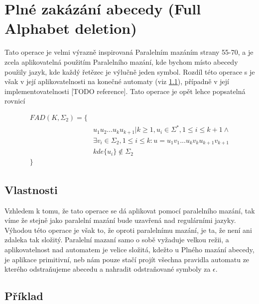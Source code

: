 \section{Plné zakázání abecedy (Full Alphabet deletion)}
Tato operace je velmi výrazně inspirovaná Paralelním mazáním \cite{lilaKari} strany 55-70, a je zcela aplikovatelná použitím Paralelního mazání, kde bychom místo abecedy použily jazyk, kde každý řetězec je výlučně jeden symbol. Rozdíl této operace s je však v její aplikovatelnosti na konečné automaty (viz \ref{subsec:fadProp}), případně v její implementovatelnosti [TODO reference]. Tato operace je opět lehce popsatelná rovnicí

\begin{equation}
	\begin{split}
		FAD(K,\Sigma_{2}) = \{&\\
		&u_{1}u_{2}...u_{k}u_{k+1}|k\geq1, u_{i} \in \Sigma^{*}, 1\leq i \leq k+1 \land\\
		&\exists v_{i} \in \Sigma_{2}, 1 \leq i \leq k:u=u_{1}v_{1}...u_{k}v_{k}u_{k+1}v_{k+1}\\
		&kde \{u_{i}\} \notin \Sigma_{2}\\
		\}&
	\end{split}
\end{equation}

\subsection{Vlastnosti}\label{subsec:fadProp}
Vzhledem k tomu, že tato operace se dá aplikovat pomocí paralelního mazání, tak víme že stejně jako paralelní mazání bude uzavřená nad regulárními jazyky. Výhodou této operace je však to, že oproti paralelnímu mazání, je ta, že není ani zdaleka tak složitý. Paralelní mazaní samo o sobě vyžaduje velkou režii, a aplikovatelnost nad automatem je velice složitá, kdežto u Plného mazání abecedy, je aplikace primitivní, neb nám pouze stačí projít všechna pravidla automatu ze kterého odstraňujeme abecedu a nahradit odstraňované symboly za $\epsilon$.

\subsection{Příklad}
 